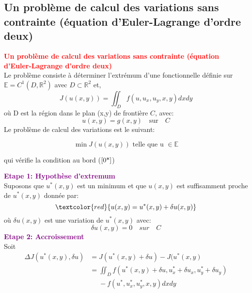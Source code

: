 \documentclass[12pt]{beamer}
\begin{document}
\subsection*{Un probl\`{e}me de calcul des variations sans contrainte (\'{e}quation d'Euler-Lagrange d'ordre deux)}
\begin{frame}
\textcolor{red}{
\textbf{Un probl\`{e}me de calcul des variations sans contrainte (\'{e}quation d'Euler-Lagrange d'ordre deux)}}\\
	Le probl\`{e}me consiste \`{a} d\'{e}terminer l'extr\'{e}mum d'une fonctionnelle d\'{e}finie sur $\mathbb{E}=C^{1}(D,\mathbb{R}^{2})$ avec $D\subset \mathbb{R}^{2} $ et,
	\begin{equation}
	\mathit{J(u(x,y))=\iint_{D}f(u,u_{x},u_{y},x,y)dxdy} \label{1*} \end{equation} 
	o\`{u} D est la r\'{e}gion dans le plan (x,y) de fronti\`{e}re $ C $, avec:
	\begin{equation}
	u(x,y)=g(x,y)\quad\text{sur}\quad C \label{0*}
	\end{equation}
Le probl\`{e}me de calcul des variations est le suivant:
\begin{block}{}
   \begin{equation}
	\min J(u(x,y))\text{ telle que u $\in \mathbb{E}$}
	\label{012}
	\end{equation}
\end{block}
	qui v\'{e}rifie la condition au bord ($\ref{0*}$)\end{frame}\begin{frame}
\textcolor{purple}{
	\textbf{\large{Etape 1: Hypoth\`{e}se d'extremum}}}\\
Suposons que $u^{*}(x,y)$ est un minimum et que $u(x,y)$ est suffisamment proche de $u^{*}(x,y)$ donn\'{e}e par:
\begin{equation}
\textcolor{red}{	u(x,y)=u^{*}(x,y)+\delta u(x,y)\label{l}}
\end{equation} 
o\`{u} $\delta u(x,y)$ est une variation de $u^{*}(x,y)$  avec:
\begin{equation}
\delta u(x,y)=0 \quad sur \quad C \label{oo}
\end{equation}
\textcolor{purple}{
\textbf{\large{Etape 2: Accroissement}}}\\
Soit
\begin{align}
\Delta J( u^{*}(x,y),\delta u)&=J(u^{*}(x,y)+\delta u)-J(u^{*}(x,y)\nonumber\\\nonumber
&=\iint_{D}f(u^{*}(x,y)+\delta u,u^{*}_{x}+\delta u_{x},u^{*}_{y}+\delta u_{y})\\&\phantom{=}-f(u^{*},u^{*}_{x},u^{*}_{y},x,y)dxdy
\label{5*}\end{align}\end{frame}
\end{document}
